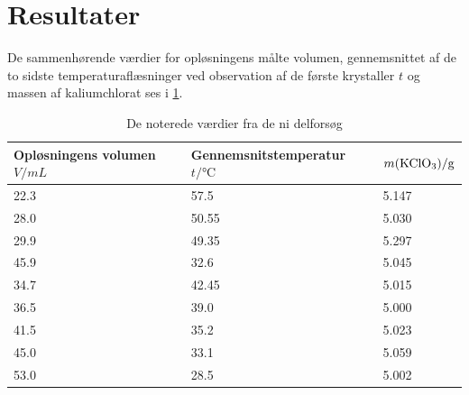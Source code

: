 \documentclass{report}
\begin{document}
\section*{Resultater}
De sammenhørende værdier for opløsningens målte volumen, gennemsnittet af de to sidste temperaturaflæsninger ved observation af de første krystaller $t$ og massen af kaliumchlorat ses i \cref{tab:resultat}.
\begin{table}[H]
\centering
\begin{tabular}{@{}lll@{}}
\toprule
Opløsningens volumen $V/\unit{mL}$ & Gennemsnitstemperatur $t/\unit{\celsius}$ & $m(\ce{KClO3})/\unit{g}$ \\ \midrule
22.3                               & 57.5                                      & 5.147                     \\
28.0                               & 50.55                                     & 5.030                     \\
29.9                               & 49.35                                     & 5.297                     \\
45.9                               & 32.6                                      & 5.045                     \\
34.7                               & 42.45                                     & 5.015                     \\
36.5                               & 39.0                                      & 5.000                     \\
41.5                               & 35.2                                      & 5.023                     \\
45.0                               & 33.1                                      & 5.059                     \\
53.0                               & 28.5                                      & 5.002                     \\ \bottomrule
\end{tabular}
\caption{De noterede værdier fra de ni delforsøg}
\label{tab:resultat}
\end{table}
\end{document}
